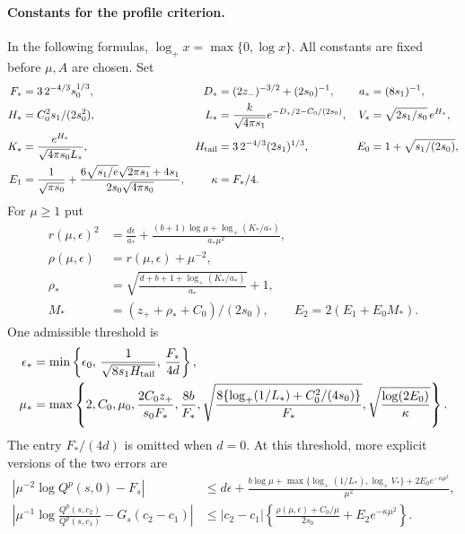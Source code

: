 \paragraph{Constants for the profile criterion.}
In the following formulas, $\log_+x=\max\{0,\log x\}$.  All constants
are fixed before $\mu,A$ are chosen.  Set
\begin{align*}
 F_*&=3\,2^{-4/3}s_0^{1/3},&
 D_*&=(2z_-)^{-3/2}+(2s_0)^{-1},& a_*&=(8s_1)^{-1},\\
 H_*&=C_0^2s_1/(2s_0^2),&
 L_*&=\frac{k}{\sqrt{4\pi s_1}}
              e^{-D_*/2-C_0/(2s_0)},&
 V_*&=\sqrt{2s_1/s_0}\,e^{H_*},\\
 K_*&=\frac{e^{H_*}}{\sqrt{4\pi s_0}L_*},&
 H_{\rm tail}&=3\,2^{-4/3}(2s_1)^{1/3},&
 E_0&=1+\sqrt{s_1/(2s_0)},\\
 E_1&=\frac1{\sqrt{\pi s_0}}+
 \frac{6\sqrt{s_1/e}\sqrt{2\pi s_1}+4s_1}
      {2s_0\sqrt{4\pi s_0}},&
 \kappa&=F_*/4.&&
\end{align*}
For $\mu\ge1$ put
\begin{align*}
 r(\mu,\epsilon)^2
  &=\frac{d\epsilon}{a_*}
    +\frac{(b+1)\log\mu+\log_+(K_*/a_*)}{a_*\mu^2},\\
 \rho(\mu,\epsilon)&=r(\mu,\epsilon)+\mu^{-2},\\
 \rho_*&=\sqrt{\frac{d+b+1+\log_+(K_*/a_*)}{a_*}}+1,\\
 M_*&=(z_++\rho_*+C_0)/(2s_0),\qquad
 E_2=2(E_1+E_0M_*).
\end{align*}
One admissible threshold is
\begin{align}
 \epsilon_*&=\min\left\{\epsilon_0,\,
             \frac1{\sqrt{8s_1H_{\rm tail}}},\,
             \frac{F_*}{4d}\right\},\label{eq:profile-epsilon-threshold}\\
 \mu_*&=\max\left\{2,C_0,\mu_0,
       \frac{2C_0z_+}{s_0F_*},\frac{8b}{F_*},
       \sqrt{\frac{8\{\log_+(1/L_*)+C_0^2/(4s_0)\}}{F_*}},
       \sqrt{\frac{\log(2E_0)}\kappa}\right\}.
       \label{eq:profile-mu-threshold}
\end{align}
The entry $F_*/(4d)$ is omitted when $d=0$.
At this threshold, more explicit versions of the two errors are
\begin{align}
 \left|\mu^{-2}\log Q^p(s,0)-F_s\right|
 &\le d\epsilon+
 \frac{b\log\mu+\max\{\log_+(1/L_*),\log_+V_*\}
              +2E_0e^{-\kappa\mu^2}}{\mu^2},
 \label{eq:profile-amplitude-explicit}\\
 \left|\mu^{-1}\log\frac{Q^p(s,c_2)}{Q^p(s,c_1)}
                 -G_s(c_2-c_1)\right|
 &\le |c_2-c_1|\left\{
       \frac{\rho(\mu,\epsilon)+C_0/\mu}{2s_0}
                     +E_2e^{-\kappa\mu^2}\right\}.
 \label{eq:profile-tilt-explicit}
\end{align}

